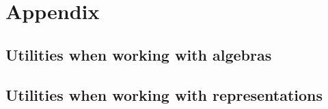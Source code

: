 \section{Appendix}

\subsection{Utilities when working with algebras} \label{app:algebras}


\subsection{Utilities when working with representations} \label{app:reprs}




